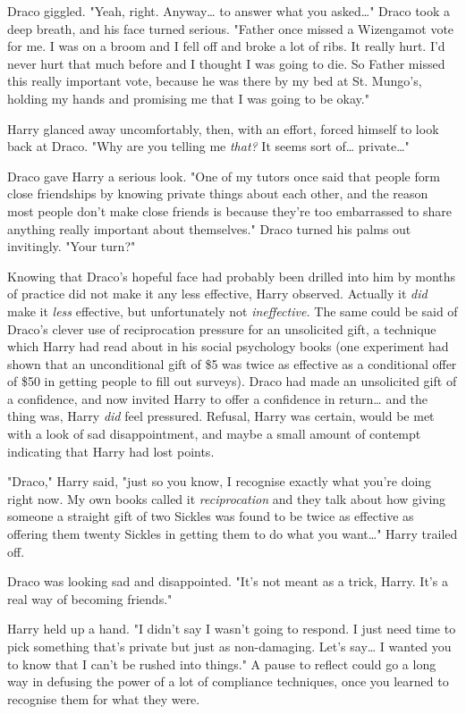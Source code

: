 Draco giggled. "Yeah, right. Anyway{\ldots} to answer what you asked{\ldots}" 
Draco took a deep breath, and his face turned serious. "Father once missed a 
Wizengamot vote for me. I was on a broom and I fell off and broke a lot of 
ribs. It really hurt. I'd never hurt that much before and I thought I was going 
to die. So Father missed this really important vote, because he was there by my 
bed at St. Mungo's, holding my hands and promising me that I was going to be 
okay."

Harry glanced away uncomfortably, then, with an effort, forced himself to look 
back at Draco. "Why are you telling me \emph{that?} It seems sort of{\ldots} 
private{\ldots}"

Draco gave Harry a serious look. "One of my tutors once said that people form 
close friendships by knowing private things about each other, and the reason 
most people don't make close friends is because they're too embarrassed to 
share anything really important about themselves." Draco turned his palms out 
invitingly. "Your turn?"

Knowing that Draco's hopeful face had probably been drilled into him by months 
of practice did not make it any less effective, Harry observed. Actually it 
\emph{did} make it \emph{less} effective, but unfortunately not 
\emph{ineffective.} The same could be said of Draco's clever use of 
reciprocation pressure for an unsolicited gift, a technique which Harry had 
read about in his social psychology books (one experiment had shown that an 
unconditional gift of \$5 was twice as effective as a conditional offer of \$50 
in getting people to fill out surveys). Draco had made an unsolicited gift of a 
confidence, and now invited Harry to offer a confidence in return{\ldots} and 
the thing was, Harry \emph{did} feel pressured. Refusal, Harry was certain, 
would be met with a look of sad disappointment, and maybe a small amount of 
contempt indicating that Harry had lost points.

"Draco," Harry said, "just so you know, I recognise exactly what you're doing 
right now. My own books called it \emph{reciprocation} and they talk about how 
giving someone a straight gift of two Sickles was found to be twice as 
effective as offering them twenty Sickles in getting them to do what you 
want{\ldots}" Harry trailed off.

Draco was looking sad and disappointed. "It's not meant as a trick, Harry. It's 
a real way of becoming friends."

Harry held up a hand. "I didn't say I wasn't going to respond. I just need time 
to pick something that's private but just as non-damaging. Let's say{\ldots} I 
wanted you to know that I can't be rushed into things." A pause to reflect 
could go a long way in defusing the power of a lot of compliance techniques, 
once you learned to recognise them for what they were.

